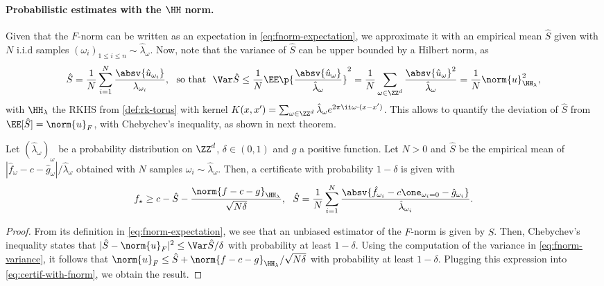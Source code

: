 \documentclass{article}
\begin{document}
\paragraph{Probabilistic estimates with the $\HH$ norm.}
Given that the $F$-norm can be written as an expectation in \cref{eq:fnorm-expectation}, we approximate it with an empirical mean $\hat{S}$ given with $N$ i.i.d samples $(\omega_i)_{1 \leq i \leq n} \sim \hat{\lambda}_\omega$. Now, note that the variance of $\hat{S}$ can be upper bounded by a Hilbert norm, as
\begin{equation}\label{eq:fnorm-variance}
  \hat{S} = \frac{1}{N} \sum_{i=1}^N \frac{\absv{\hat{u}_{\omega_i}}}{\lambda_{\omega_i}}, ~~ \text{so that} ~~ \Var \hat{S} \leq \frac{1}{N} \EE \p{\frac{\absv{\hat{u}_\omega}}{\hat{\lambda}_\omega}}^2 = \frac{1}{N} \sum_{\omega \in \ZZ^d} \frac{\absv{\hat{u}_\omega}^2}{\hat{\lambda}_\omega} = \frac{1}{N} \norm{u}_{\HH_\lambda}^2,
\end{equation}
with $\HH_\lambda$ the RKHS from \cref{def:rk-torus} with kernel $K(x,x') = \sum_{\omega \in \ZZ^d} \hat{\lambda}_\omega e^{2\pi \ii \omega \cdot (x-x')}$. This allows to quantify the deviation of $\hat{S}$ from $\EE[\hat{S}] = \norm{u}_F$, with \eg Chebychev's inequality, as shown in next theorem.

\begin{theorem}\label{thm:certificate-cheby}
  Let $(\hat{\lambda}_\omega)_{\omega}$ be a probability distribution on $\ZZ^d$, $\delta \in (0,1)$ and $g$ a positive function. Let $N > 0$ and $\hat{S}$ be the empirical mean of $|\hat{f}_\omega - c - \hat{g}_\omega|/\hat{\lambda}_\omega$ obtained with $N$ samples $\omega_i \sim \hat{\lambda}_\omega$. Then, a certificate with probability $1-\delta$ is given with
  \begin{equation}\label{eq:certificate-cheby}
    f_\star \geq c - \hat{S} - \frac{\norm{f - c - g}_{\HH_\lambda}}{\sqrt{N\delta}}, ~~ \hat{S} = \frac{1}{N} \sum_{i=1}^N \frac{\absv{\hat{f}_{\omega_i} - c \one_{\omega_i = 0} - \hat{g}_{\omega_i}}}{\hat{\lambda}_{\omega_i}}.
  \end{equation}
\end{theorem}
\begin{proof}
  From its definition in \cref{eq:fnorm-expectation}, we see that an unbiased estimator of the $F$-norm is given by $\hat{S}$.
  Then, Chebychev's inequality states that $|\hat{S} - \norm{u}_F|^2 \leq \Var \hat{S}/\delta$ with probability at least $1-\delta$.
  Using the computation of the variance in \cref{eq:fnorm-variance}, it follows that $\norm{u}_F \leq \hat{S} + \norm{f - c - g}_{\HH_\lambda}/\sqrt{N\delta}$ with probability at least $1 - \delta$. Plugging this expression into \cref{eq:certif-with-fnorm}, we obtain the result.
\end{proof}
\end{document}
